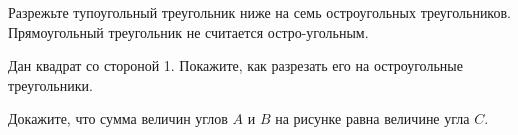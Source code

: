 ﻿
\begin{itemize}

\itA Разрежьте тупоугольный треугольник ниже на семь остроугольных треугольников. Прямоугольный треугольник не считается остро-\linebreak угольным.

\smallskip
\begin{center}  \end{center}

\itB Дан квадрат со стороной \SI{1}{}. Покажите, как разрезать его на остроугольные треугольники.

\itC Докажите, что сумма величин углов $A$ и $B$ на рисунке равна величине угла $C$.

\smallskip
\begin{center}  \end{center}

\end{itemize}